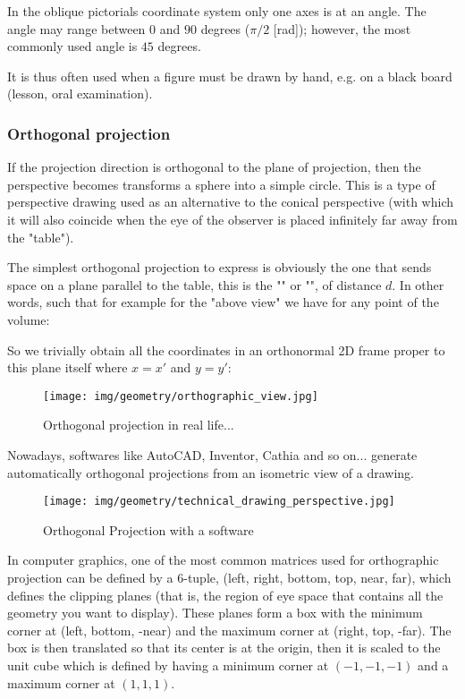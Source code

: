 	In the oblique pictorials coordinate system only one axes is at an angle. The angle may range between $0$ and $90$ degrees ($\pi/2$ [rad]); however, the most commonly used angle is $45$ degrees.

 	It is thus often used when a figure must be drawn by hand, e.g. on a black board (lesson, oral examination).
 	
 	\pagebreak
 	\subsubsection{Orthogonal projection}
	If the projection direction is orthogonal to the plane of projection, then the perspective becomes transforms a sphere into a simple circle. This is a type of perspective drawing used as an alternative to the conical perspective (with which it will also coincide when the eye of the observer is placed infinitely far away from the "table").

	The simplest orthogonal projection to express is obviously the one that sends space on a plane parallel to the table, this is the "" or "", of distance $d$. In other words, such that for example for the "above view" we have for any point of the volume:
	
	So we trivially obtain all the coordinates in an orthonormal 2D frame proper to this plane itself where $x=x'$ and $y=y'$:
	\begin{figure}[H]
		\centering
		\texttt{[image: img/geometry/orthographic\_view.jpg]}
		\caption{Orthogonal projection in real life...}
	\end{figure}
	Nowadays, softwares like AutoCAD, Inventor, Cathia and so on... generate automatically orthogonal projections from an isometric view of a drawing.
	\begin{figure}[H]
		\centering
		\texttt{[image: img/geometry/technical\_drawing\_perspective.jpg]}
		\caption[]{Orthogonal Projection with a software}
	\end{figure}
	In computer graphics, one of the most common matrices used for orthographic projection can be defined by a $6$-tuple, (left, right, bottom, top, near, far), which defines the clipping planes (that is, the region of eye space that contains all the geometry you want to display). These planes form a box with the minimum corner at (left, bottom, -near) and the maximum corner at (right, top, -far). The box is then translated so that its center is at the origin, then it is scaled to the unit cube which is defined by having a minimum corner at $(-1,-1,-1)$ and a maximum corner at $(1,1,1)$.

